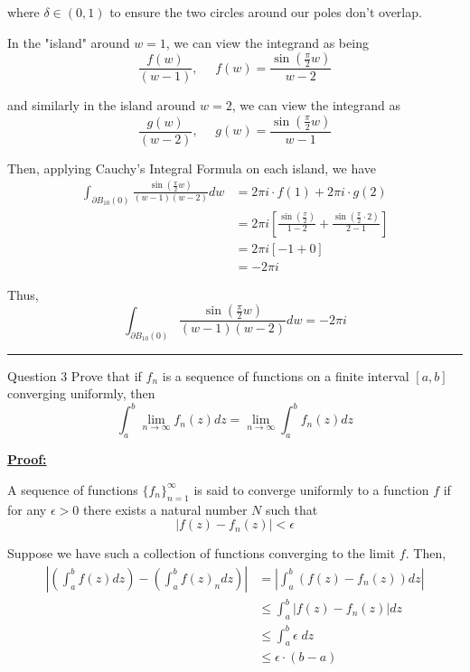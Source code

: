 \documentclass{article}
\begin{document}
where $\delta \in (0, 1)$ to ensure the two circles around our poles don't overlap.

\vskip 0.5cm
In the "island" around $w = 1$, we can view the integrand as being 
\[ \frac{f(w)}{(w-1)}, \;\;\;\;\ f(w) = \frac{\sin \left( \frac{\pi}{2} w \right)}{w - 2} \]

and similarly in the island around $w = 2$, we can view the integrand as 
\[ \frac{g(w)}{(w-2)}, \;\;\;\;\ g(w) = \frac{\sin \left( \frac{\pi}{2} w \right)}{w - 1} \]

\vskip 0.5cm
Then, applying Cauchy's Integral Formula on each island, we have 
\begin{align*}
  \int_{\partial B_{10}(0)}  \frac{\sin\left( \frac{\pi}{2} w \right)}{(w-1)(w-2)} dw &= 2\pi i \cdot f(1) + 2\pi i \cdot g(2) \\
  &= 2\pi i \left[ \frac{\sin\left(\frac{\pi}{2}\right)}{1-2} + \frac{\sin\left(\frac{\pi}{2} \cdot 2\right)}{2-1} \right] \\
  &= 2\pi i \left[ -1 + 0\right] \\
  &=-2\pi i 
\end{align*}

Thus,
\[ \boxed{\int_{\partial B_{10}(0)}  \frac{\sin\left( \frac{\pi}{2} w \right)}{(w-1)(w-2)} dw = -2\pi i } \]

\vskip 0.5cm
\hrule 
\vskip 0.5cm


\begin{mathdefinitionbox}{Question 3}
\vskip 0.5cm
Prove that if $f_n$ is a sequence of functions on a finite interval $[a,b]$ converging uniformly, then 
\[ \int_{a}^{b} \lim_{n \rightarrow \infty}  f_n(z) dz = \lim_{n \rightarrow \infty} \int_{a}^{b} f_n(z) dz \]
\end{mathdefinitionbox}

\vskip 0.5cm
\underline{\textbf{Proof:}}

A sequence of functions $\{f_n\}_{n = 1}^{\infty}$ is said to converge uniformly to a function $f$ if for any $\epsilon > 0$ there exists a natural number $N$ such that 
\[ \left| f(z) - f_n(z) \right| < \epsilon \] 

Suppose we have such a collection of functions converging to the limit $f$. Then,
\begin{align*}
  \left| \left(\int_{a}^{b} f(z) dz\right) - \left(\int_a^b f(z)_n dz\right) \right| &= \left| \int_{a}^{b} \left(f(z) - f_n(z)\right) dz \right| \\
  &\leq \int_{a}^{b} \left| f(z) - f_n(z) \right| dz \\
  &\leq \int_{a}^{b} \epsilon\; dz \\
  &\leq \epsilon \cdot (b-a) 
\end{align*}
\end{document}
